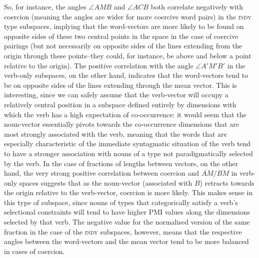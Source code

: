 So, for instance, the angles $\angle AMB$ and $\angle ACB$ both correlate negatively with coercion (meaning the angles are wider for more coercive word pairs) in the \textsc{indy} type subspaces, implying that the word-vectors are more likely to be found on opposite sides of these two central points in the space in the case of coercive pairings (but not necessarily on opposite sides of the lines extending from the origin through these points--they could, for instance, be above and below a point relative to the origin).  The positive correlation with the angle $\angle A'M'B'$ in the verb-only subspaces, on the other hand, indicates that the word-vectors tend to be on opposite sides of the lines extending through the mean vector.  This is interesting, since we can safely assume that the verb-vector will occupy a relatively central position in a subspace defined entirely by dimensions with which the verb has a high expectation of co-occurrence: it would seem that the noun-vector essentially pivots towards the co-occurrence dimensions that are most strongly associated with the verb, meaning that the words that are especially characteristic of the immediate syntagmatic situation of the verb tend to have a stronger association with nouns of a type not paradigmatically selected by the verb.  In the case of fractions of lengths between vectors, on the other hand, the very strong positive correlation between coercion and $\overline{AM}/\overline{BM}$ in verb-only spaces suggests that as the noun-vector (associated with $B$) retracts towards the origin relative to the verb-vector, coercion is more likely.  This makes sense in this type of subspace, since nouns of types that categorically satisfy a verb's selectional constraints will tend to have higher PMI values along the dimensions selected by that verb.  The negative value for the normalised version of the same fraction in the case of the \textsc{indy} subspaces, however, means that the respective angles between the word-vectors and the mean vector tend to be more balanced in cases of coercion.

